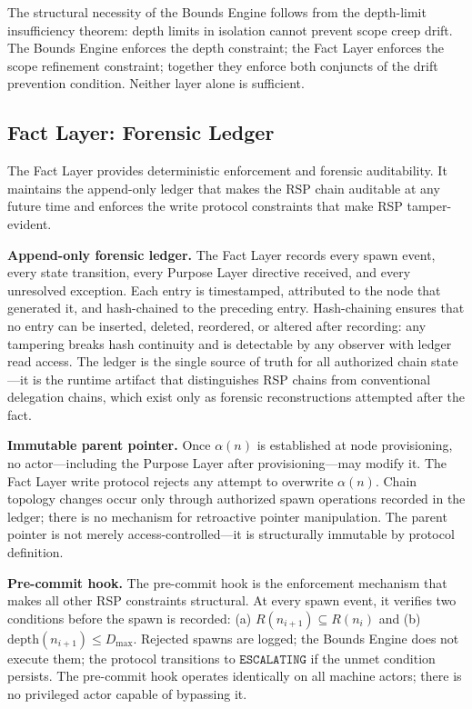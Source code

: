 The structural necessity of the Bounds Engine follows from the depth-limit insufficiency theorem: depth limits in isolation cannot prevent scope creep drift. The Bounds Engine enforces the depth constraint; the Fact Layer enforces the scope refinement constraint; together they enforce both conjuncts of the drift prevention condition. Neither layer alone is sufficient.

\subsection{Fact Layer: Forensic Ledger}
\label{sec:rs-fact-ledger}

The Fact Layer provides deterministic enforcement and forensic auditability. It maintains the append-only ledger that makes the RSP chain auditable at any future time and enforces the write protocol constraints that make RSP tamper-evident.

\medskip
\noindent\textbf{Append-only forensic ledger.} The Fact Layer records every spawn event, every state transition, every Purpose Layer directive received, and every unresolved exception. Each entry is timestamped, attributed to the node that generated it, and hash-chained to the preceding entry. Hash-chaining ensures that no entry can be inserted, deleted, reordered, or altered after recording: any tampering breaks hash continuity and is detectable by any observer with ledger read access. The ledger is the single source of truth for all authorized chain state---it is the runtime artifact that distinguishes RSP chains from conventional delegation chains, which exist only as forensic reconstructions attempted after the fact.

\medskip
\noindent\textbf{Immutable parent pointer.} Once $\alpha(n)$ is established at node provisioning, no actor---including the Purpose Layer after provisioning---may modify it. The Fact Layer write protocol rejects any attempt to overwrite $\alpha(n)$. Chain topology changes occur only through authorized spawn operations recorded in the ledger; there is no mechanism for retroactive pointer manipulation. The parent pointer is not merely access-controlled---it is structurally immutable by protocol definition.

\medskip
\noindent\textbf{Pre-commit hook.} The pre-commit hook is the enforcement mechanism that makes all other RSP constraints structural. At every spawn event, it verifies two conditions before the spawn is recorded: (a) $R(n_{i+1}) \subseteq R(n_i)$ and (b) $\mathrm{depth}(n_{i+1}) \leq D_{\mathrm{max}}$. Rejected spawns are logged; the Bounds Engine does not execute them; the protocol transitions to $\texttt{ESCALATING}$ if the unmet condition persists. The pre-commit hook operates identically on all machine actors; there is no privileged actor capable of bypassing it.

